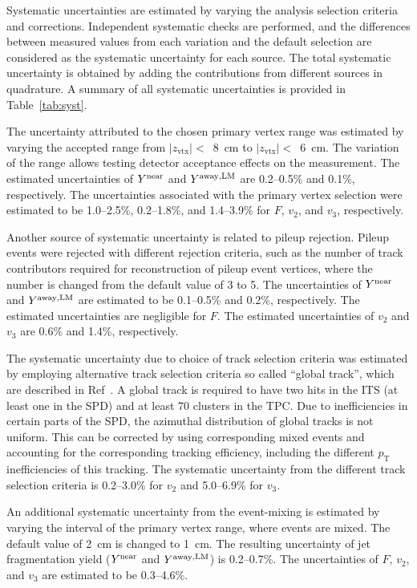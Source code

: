 Systematic uncertainties are estimated by varying the analysis selection criteria and corrections. Independent systematic checks are performed, and the differences between measured values from each variation and the default selection are considered as the systematic uncertainty for each source. The total systematic uncertainty is obtained by adding the contributions from different sources in quadrature. A summary of all systematic uncertainties is provided in Table~\ref{tab:syst}. 

The uncertainty attributed to the chosen primary vertex range was estimated by varying the accepted range from $|z_\mathrm{vtx}|<$~8~cm to $|z_\mathrm{vtx}|<$~6~cm. The variation of the range allows testing detector acceptance effects on the measurement. The estimated uncertainties of $Y^{\rm{near}}$ and $Y^{\rm{away,LM}}$ are 0.2--0.5\% and 0.1\%, respectively. The uncertainties associated with the primary vertex selection were estimated to be 1.0--2.5\%, 0.2--1.8\%, and 1.4--3.9\% for $F$, $v_{2}$, and $v_{3}$, respectively. 

Another source of systematic uncertainty is related to pileup rejection. Pileup events were rejected with different rejection criteria, such as the number of track contributors required for reconstruction of pileup event vertices, where the number is changed from the default value of 3 to 5. The uncertainties of $Y^{\rm{near}}$ and $Y^{\rm{away,LM}}$ are estimated to be 0.1--0.5\% and 0.2\%, respectively. The estimated uncertainties are negligible for $F$. The estimated uncertainties of $v_{2}$ and $v_{3}$ are 0.6\% and 1.4\%, respectively.

The systematic uncertainty due to choice of track selection criteria was estimated by employing alternative track selection criteria so called “global track”, which are described in Ref~\cite{ALICE:2021ptz}. A global track is required to have two hits in the ITS (at least one in the SPD) and at least 70 clusters in the TPC. Due to inefficiencies in certain parts of the SPD, the azimuthal distribution of global tracks is not uniform. This can be corrected by using corresponding mixed events and accounting for the corresponding tracking efficiency, including the different $p_{\mathrm{T}}$ inefficiencies of this tracking. The systematic uncertainty from the different track selection criteria is  0.2--3.0\% for $v_{2}$ and  5.0--6.9\% for $v_{3}$. 


An additional systematic uncertainty from the event-mixing is estimated by varying the interval of the primary vertex range, where events are mixed. The default value of 2~cm is changed to 1~cm. The resulting uncertainty of jet fragmentation yield ($Y^{\rm{near}}$ and $Y^{\rm{away,LM}}$) is 0.2--0.7\%. The uncertainties of $F$, $v_{2}$, and $v_{3}$ are estimated to be 0.3--4.6\%.

